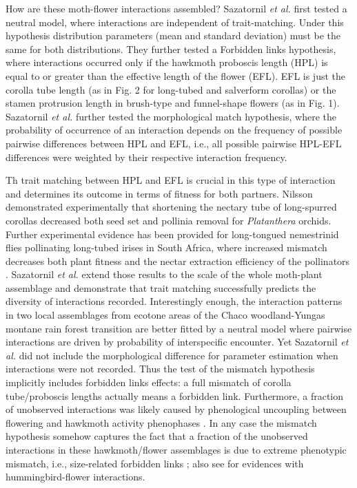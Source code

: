 \documentclass[a4paper,12pt]{article}
\begin{document}
How are these moth-flower interactions assembled? Sazatornil \textit{et al.} \citep{Sazatornil:2016} first tested a neutral model, where interactions are independent of trait-matching. Under this hypothesis distribution parameters (mean and standard deviation) must be the same for both distributions. They further tested a Forbidden links hypothesis, where interactions occurred only if the hawkmoth proboscis length (HPL) is equal to or greater than the effective length of the flower (EFL). EFL is just the corolla tube length (as in Fig. 2 for long-tubed and salverform corollas) or the stamen protrusion length in brush-type and funnel-shape flowers (as in Fig. 1). Sazatornil \textit{et al.} further tested the morphological match hypothesis, where the probability of occurrence of an interaction depends on the frequency of possible pairwise differences between HPL and EFL, i.e., all possible pairwise HPL-EFL differences were weighted by their respective interaction frequency.

Th trait matching between HPL and EFL is crucial in this type of interaction and determines its outcome in terms of fitness for both partners. Nilsson \citep{Nilsson:1988} demonstrated experimentally that shortening the nectary tube of long-spurred corollas decreased both seed set and pollinia removal for \textit{Platanthera} orchids. Further experimental evidence has been provided for long-tongued nemestrinid flies pollinating long-tubed irises in South Africa, where increased mismatch decreases both plant fitness and the nectar extraction efficiency of the pollinators \citep{Pauw:2009}. Sazatornil \textit{et al.} extend those results to the scale of the whole moth-plant assemblage and demonstrate that trait matching successfully predicts the diversity of interactions recorded. Interestingly enough, the interaction patterns in two local assemblages from ecotone areas of the Chaco woodland-Yungas montane rain forest transition are better fitted by a neutral model where pairwise interactions are driven by probability of interspecific encounter. Yet Sazatornil \textit{et al.} did not include the morphological difference for parameter estimation when interactions were not recorded. Thus the test of the mismatch hypothesis implicitly includes forbidden links effects: a full mismatch of corolla tube/proboscis lengths actually means a forbidden link. Furthermore,  a fraction of unobserved interactions was likely caused by phenological uncoupling between flowering and hawkmoth activity phenophases \citep{BasJor:2014,Sazatornil:2016}. In any case the mismatch hypothesis somehow captures the fact that a fraction of the unobserved interactions in these hawkmoth/flower assemblages is due to extreme phenotypic mismatch, i.e., size-related forbidden links \citep{Sazatornil:2016}; also see \citep{VizentinBugoni:2014} for evidences with hummingbird-flower interactions. 
\end{document}
